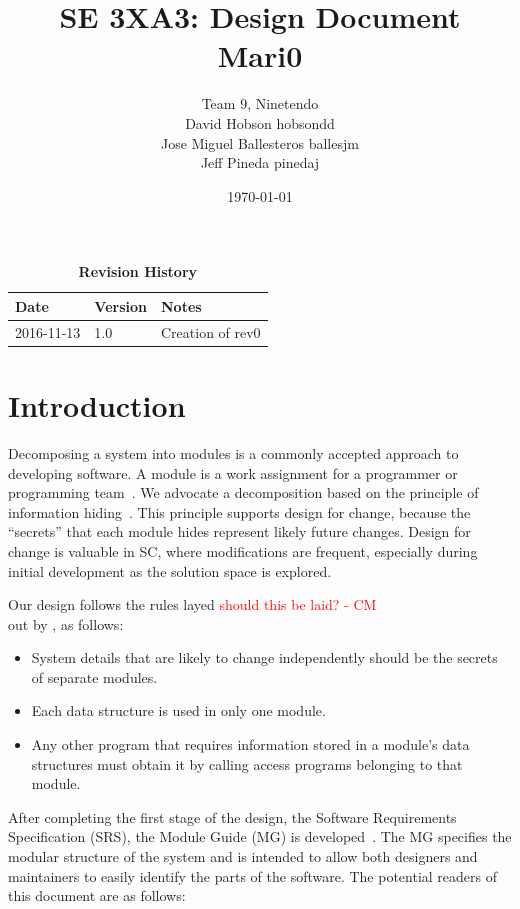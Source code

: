 \documentclass[12pt, titlepage]{article}
\title{SE 3XA3: Design Document\\Mari0}
\author{Team 9, Ninetendo
		\\ David Hobson hobsondd
		\\ Jose Miguel Ballesteros ballesjm
		\\ Jeff Pineda pinedaj
}
\date{\today}
\begin{document}
\maketitle

\tableofcontents
\listoftables
\listoffigures

\begin{table}[bp]
\caption{\bf Revision History}
\begin{tabularx}{\textwidth}{p{3cm}p{2cm}X}
\toprule {\bf Date} & {\bf Version} & {\bf Notes}\\
\midrule
2016-11-13 & 1.0 & Creation of rev0\\
\bottomrule
\end{tabularx}
\end{table}

\newpage


\section{Introduction}

Decomposing a system into modules is a commonly accepted approach to developing
software.  A module is a work assignment for a programmer or programming
team~\citep{ParnasEtAl1984}.  We advocate a decomposition
based on the principle of information hiding~\citep{Parnas1972a}.  This
principle supports design for change, because the ``secrets'' that each module
hides represent likely future changes.  Design for change is valuable in SC,
where modifications are frequent, especially during initial development as the
solution space is explored.  

Our design follows the rules layed \textcolor{red}{should this be laid? - CM} \\ out by \citet{ParnasEtAl1984}, as follows:
\begin{itemize}
\item System details that are likely to change independently should be the
  secrets of separate modules.
\item Each data structure is used in only one module.
\item Any other program that requires information stored in a module's data
  structures must obtain it by calling access programs belonging to that module.
\end{itemize}

After completing the first stage of the design, the Software Requirements
Specification (SRS), the Module Guide (MG) is developed~\citep{ParnasEtAl1984}. The MG
specifies the modular structure of the system and is intended to allow both
designers and maintainers to easily identify the parts of the software.  The
potential readers of this document are as follows:
\end{document}
